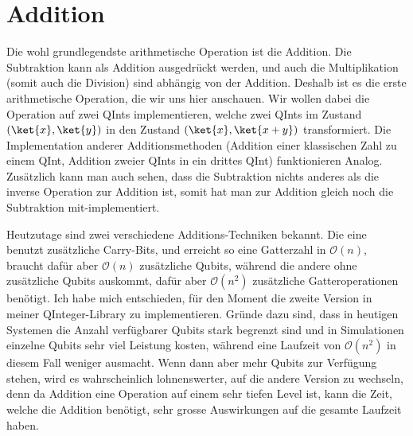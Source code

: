 

\section{Addition}
Die wohl grundlegendste arithmetische Operation ist die Addition. Die Subtraktion kann als Addition ausgedrückt werden, und auch die Multiplikation (somit auch die Division) sind abhängig von der Addition. Deshalb ist es die erste arithmetische Operation, die wir uns hier anschauen. Wir wollen dabei die Operation auf zwei QInts implementieren, welche zwei QInts im Zustand $(\ket{x}, \ket{y})$ in den Zustand $(\ket{x}, \ket{x + y})$ transformiert. Die Implementation anderer Additionsmethoden (Addition einer klassischen Zahl zu einem QInt, Addition zweier QInts in ein drittes QInt) funktionieren Analog. Zusätzlich kann man auch sehen, dass die Subtraktion nichts anderes als die inverse Operation zur Addition ist, somit hat man zur Addition gleich noch die Subtraktion mit-implementiert.

Heutzutage sind zwei verschiedene Additions-Techniken bekannt. Die eine benutzt zusätzliche Carry-Bits, und erreicht so eine Gatterzahl in $\mathcal O(n)$, braucht dafür aber $\mathcal O(n)$ zusätzliche Qubits, während die andere ohne zusätzliche Qubits auskommt, dafür aber $\mathcal O(n^2)$ zusätzliche Gatteroperationen benötigt. Ich habe mich entschieden, für den Moment die zweite Version in meiner QInteger-Library zu implementieren. Gründe dazu sind, dass in heutigen Systemen die Anzahl verfügbarer Qubits stark begrenzt sind und in Simulationen einzelne Qubits sehr viel Leistung kosten, während eine Laufzeit von $\mathcal O(n^2)$ in diesem Fall weniger ausmacht. Wenn dann aber mehr Qubits zur Verfügung stehen, wird es wahrscheinlich lohnenswerter, auf die andere Version zu wechseln, denn da Addition eine Operation auf einem sehr tiefen Level ist, kann die Zeit, welche die Addition benötigt, sehr grosse Auswirkungen auf die gesamte Laufzeit haben.

